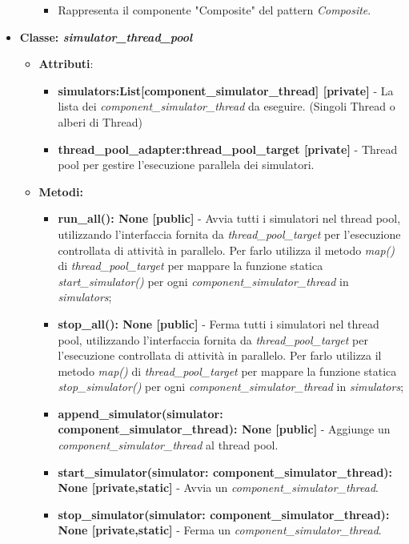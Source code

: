 \begin{itemize}
\begin{itemize}
\begin{itemize}
            \item Rappresenta il componente "Composite" del pattern \textit{Composite}.
        \end{itemize}
    \end{itemize}
    \item{\textbf{Classe: \textit{simulator\_thread\_pool}}}
    \begin{itemize}
        \item\textbf{Attributi}:
        \begin{itemize}
            \item \textbf{simulators:List[component\_simulator\_thread] [private]} - La lista dei \textit{component\_simulator\_thread} da eseguire. (Singoli Thread o alberi di Thread)
            \item \textbf{thread\_pool\_adapter:thread\_pool\_target [private]} - Thread pool per gestire l'esecuzione parallela dei simulatori.
        \end{itemize}
        \item \textbf{Metodi: }
        \begin{itemize}
            \item \textbf{run\_all(): None [public]} - Avvia tutti i simulatori nel thread pool, utilizzando l'interfaccia fornita da \textit{thread\_pool\_target} per l'esecuzione controllata di attività in parallelo.
            Per farlo utilizza il metodo \textit{map()} di \textit{thread\_pool\_target} per mappare la funzione statica \textit{start\_simulator()} per ogni \textit{component\_simulator\_thread} in \textit{simulators};
            \item \textbf{stop\_all(): None [public]} - Ferma tutti i simulatori nel thread pool, utilizzando l'interfaccia fornita da \textit{thread\_pool\_target} per l'esecuzione controllata di attività in parallelo.
            Per farlo utilizza il metodo \textit{map()} di \textit{thread\_pool\_target} per mappare la funzione statica \textit{stop\_simulator()} per ogni \textit{component\_simulator\_thread} in \textit{simulators};
            \item \textbf{append\_simulator(simulator: component\_simulator\_thread): None [public]} - Aggiunge un \textit{component\_simulator\_thread} al thread pool.
            \item \textbf{start\_simulator(simulator: component\_simulator\_thread): None [private,static]} - Avvia un \textit{component\_simulator\_thread}.
            \item \textbf{stop\_simulator(simulator: component\_simulator\_thread): None [private,static]} - Ferma un \textit{component\_simulator\_thread}.

\end{itemize}
\end{itemize}
\end{itemize}
